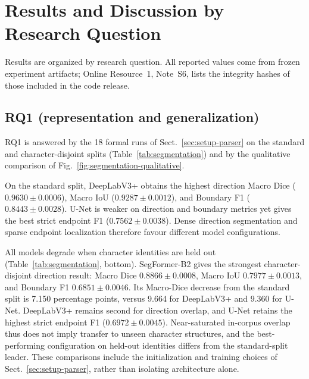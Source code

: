 \section{Results and Discussion by Research Question}
\label{sec:results}

Results are organized by research question. All reported values come from
frozen experiment artifacts; Online Resource~1, Note~S6, lists the integrity
hashes of those included in the code release.

\subsection{RQ1 (representation and generalization)}
\label{sec:rq1}

RQ1 is answered by the 18 formal runs of Sect.~\ref{sec:setup-parser} on
the standard and character-disjoint splits (Table~\ref{tab:segmentation})
and by the qualitative comparison of
Fig.~\ref{fig:segmentation-qualitative}.



On the standard split, DeepLabV3+ obtains the highest direction Macro Dice
(\(0.9630\pm0.0006\)), Macro IoU (\(0.9287\pm0.0012\)), and Boundary F1
(\(0.8443\pm0.0028\)). U-Net is weaker on direction and boundary
metrics yet gives the best strict endpoint F1 (\(0.7562\pm0.0038\)). Dense
direction segmentation and sparse endpoint localization therefore favour
different model configurations.



All models degrade when character identities are held out
(Table~\ref{tab:segmentation}, bottom). SegFormer-B2
gives the strongest character-disjoint direction result: Macro Dice
\(0.8866\pm0.0008\), Macro IoU \(0.7977\pm0.0013\), and Boundary F1
\(0.6851\pm0.0046\). Its Macro-Dice decrease from the standard split is 7.150
percentage points, versus 9.664 for DeepLabV3+ and 9.360 for U-Net.
DeepLabV3+ remains second for direction overlap, and U-Net retains the
highest strict endpoint F1 (\(0.6972\pm0.0045\)). Near-saturated in-corpus
overlap thus does not imply transfer to unseen character structures, and the
best-performing configuration on held-out identities differs from the
standard-split leader. These comparisons include the initialization and
training choices of Sect.~\ref{sec:setup-parser}, rather than isolating
architecture alone.

